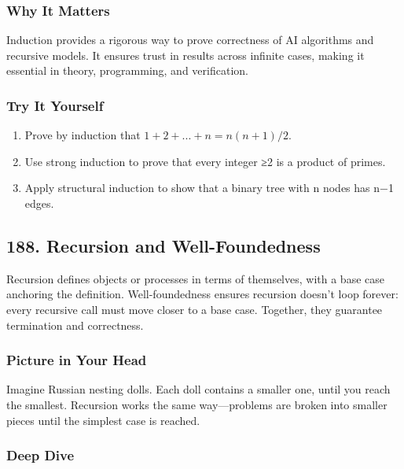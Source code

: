 \documentclass[
  letterpaper,
  DIV=11,
  numbers=noendperiod]{scrreprt}
\providecommand{\tightlist}{%
  \setlength{\itemsep}{0pt}\setlength{\parskip}{0pt}}
\begin{document}
\subsubsection{Why It Matters}\label{why-it-matters-84}

Induction provides a rigorous way to prove correctness of AI algorithms
and recursive models. It ensures trust in results across infinite cases,
making it essential in theory, programming, and verification.

\subsubsection{Try It Yourself}\label{try-it-yourself-186}

\begin{enumerate}
\def\labelenumi{\arabic{enumi}.}
\tightlist
\item
  Prove by induction that \(1+2+...+n = n(n+1)/2\).
\item
  Use strong induction to prove that every integer ≥2 is a product of
  primes.
\item
  Apply structural induction to show that a binary tree with n nodes has
  n−1 edges.
\end{enumerate}

\subsection{188. Recursion and
Well-Foundedness}\label{recursion-and-well-foundedness}

Recursion defines objects or processes in terms of themselves, with a
base case anchoring the definition. Well-foundedness ensures recursion
doesn't loop forever: every recursive call must move closer to a base
case. Together, they guarantee termination and correctness.

\subsubsection{Picture in Your Head}\label{picture-in-your-head-187}

Imagine Russian nesting dolls. Each doll contains a smaller one, until
you reach the smallest. Recursion works the same way---problems are
broken into smaller pieces until the simplest case is reached.

\subsubsection{Deep Dive}\label{deep-dive-187}
\end{document}

